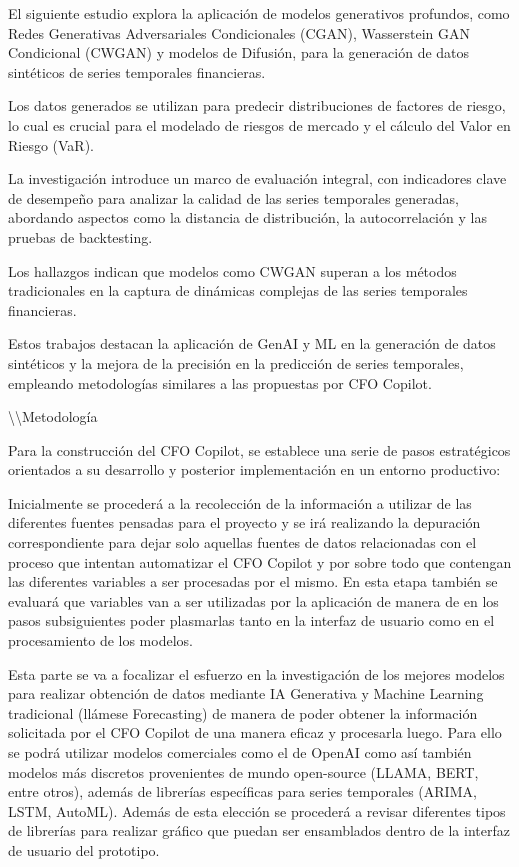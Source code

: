 \documentclass[12pt,letterpaper,oneside]{report}
\renewcommand{\_}{\UnderscoreOriginal\allowbreak}
\begin{document}
El siguiente estudio explora la aplicación de modelos generativos profundos, como Redes Generativas Adversariales Condicionales (CGAN), Wasserstein GAN Condicional (CWGAN) y modelos de Difusión, para la generación de datos sintéticos de series temporales financieras. \parencite{Ericson2024}

Los datos generados se utilizan para predecir distribuciones de factores de riesgo, lo cual es crucial para el modelado de riesgos de mercado y el cálculo del Valor en Riesgo (VaR).

La investigación introduce un marco de evaluación integral, con indicadores clave de desempeño para analizar la calidad de las series temporales generadas, abordando aspectos como la distancia de distribución, la autocorrelación y las pruebas de backtesting.

Los hallazgos indican que modelos como CWGAN superan a los métodos tradicionales en la captura de dinámicas complejas de las series temporales financieras.

Estos trabajos destacan la aplicación de GenAI y ML en la generación de datos sintéticos y la mejora de la precisión en la predicción de series temporales, empleando metodologías similares a las propuestas por CFO Copilot.

\textbackslash{}\textbackslash{}Metodología

Para la construcción del CFO Copilot, se establece una serie de pasos estratégicos orientados a su desarrollo y posterior implementación en un entorno productivo:

Inicialmente se procederá a la recolección de la información a utilizar de las diferentes fuentes pensadas para el proyecto y se irá realizando la depuración correspondiente para dejar solo aquellas fuentes de datos relacionadas con el proceso que intentan automatizar el CFO Copilot y por sobre todo que contengan las diferentes variables a ser procesadas por el mismo. En esta etapa también se evaluará que variables van a ser utilizadas por la aplicación de manera de en los pasos subsiguientes poder plasmarlas tanto en la interfaz de usuario como en el procesamiento de los modelos.

Esta parte se va a focalizar el esfuerzo en la investigación de los mejores modelos para realizar obtención de datos mediante IA Generativa y Machine Learning tradicional (llámese Forecasting) de manera de poder obtener la información solicitada por el CFO Copilot de una manera eficaz y procesarla luego. Para ello se podrá utilizar modelos comerciales como el de OpenAI como así también modelos más discretos provenientes de mundo open-source (LLAMA, BERT, entre otros), además de librerías específicas para series temporales (ARIMA, LSTM, AutoML). Además de esta elección se procederá a revisar diferentes tipos de librerías para realizar gráfico que puedan ser ensamblados dentro de la interfaz de usuario del prototipo.
\end{document}
